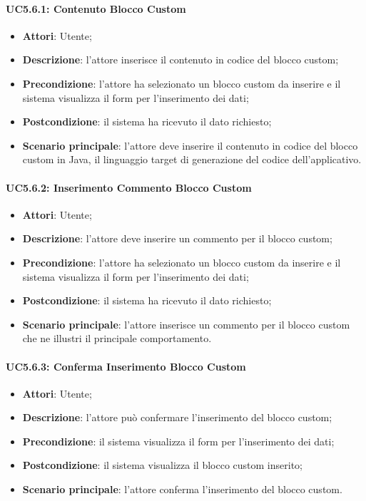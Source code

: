 \paragraph{UC5.6.1: Contenuto Blocco Custom}
\label{UC5.6.1}
\begin{itemize}
\item \textbf{Attori}: Utente;
\item \textbf{Descrizione}: l'attore inserisce il contenuto in codice del blocco custom;	
\item \textbf{Precondizione}: l'attore ha selezionato un blocco custom da inserire e il sistema visualizza il form per l'inserimento dei dati;	
\item \textbf{Postcondizione}: il sistema ha ricevuto il dato richiesto;	
\item \textbf{Scenario principale}:
l'attore deve inserire il contenuto in codice del blocco custom in Java, il linguaggio target di generazione del codice dell'applicativo.	
\end{itemize}

\paragraph{UC5.6.2: Inserimento Commento Blocco Custom}
\label{UC5.6.2}
\begin{itemize}
\item \textbf{Attori}: Utente;
\item \textbf{Descrizione}: l'attore deve inserire un commento per il blocco custom;	
\item \textbf{Precondizione}: l'attore ha selezionato un blocco custom da inserire e il sistema visualizza il form per l'inserimento dei dati;	
\item \textbf{Postcondizione}: il sistema ha ricevuto il dato richiesto;	
\item \textbf{Scenario principale}:
l'attore inserisce un commento per il blocco custom che ne illustri il principale comportamento.
\end{itemize}

\paragraph{UC5.6.3: Conferma Inserimento Blocco Custom}
\label{UC5.6.3}
\begin{itemize}
\item \textbf{Attori}: Utente;
\item \textbf{Descrizione}: l'attore può confermare l'inserimento del blocco custom;	
\item \textbf{Precondizione}: il sistema visualizza il form per l'inserimento dei dati;	
\item \textbf{Postcondizione}: il sistema visualizza il blocco custom inserito;	
\item \textbf{Scenario principale}:
l'attore conferma l'inserimento del blocco custom.
\end{itemize}

